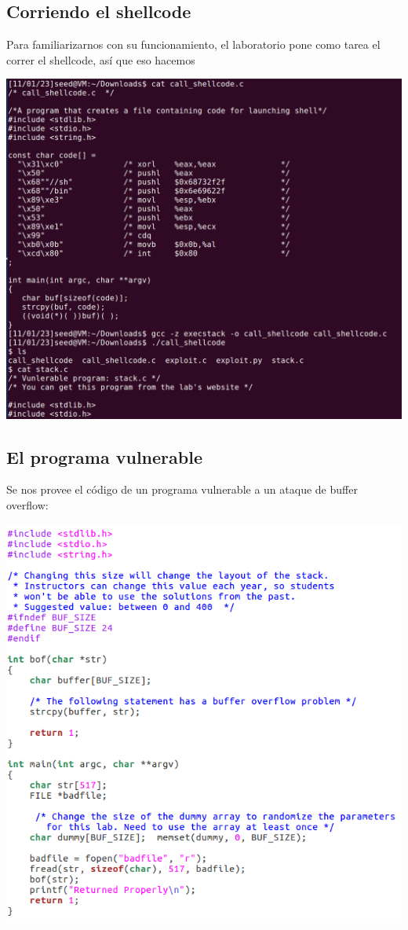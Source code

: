 \documentclass[11pt]{article}
\begin{document}
\subsection*{Corriendo el shellcode}
Para familiarizarnos con su funcionamiento, el laboratorio pone como tarea el correr el shellcode, así que eso hacemos

\begin{center}
\includegraphics[scale=0.4]{callshellcode.png}
\end{center}

\subsection{El programa vulnerable}
Se nos provee el código de un programa vulnerable a un ataque de buffer overflow:

\begin{center}
\includegraphics[scale=0.55]{codigostack.png}
\end{center}
\end{document}
